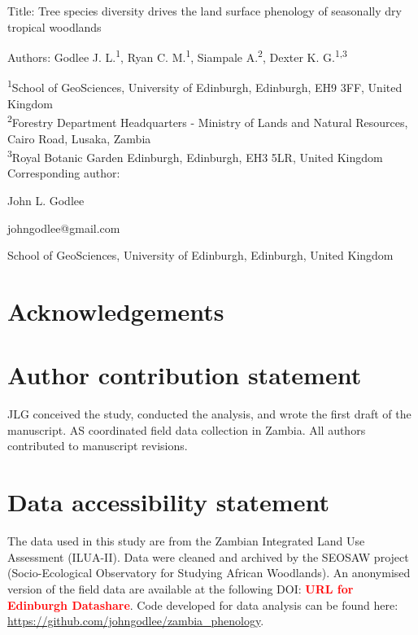 \documentclass[11pt,a4paper]{article}
\newcommand{\todo}[1]{\textcolor{red}{\textbf{#1}}}   %
\begin{document}
{\Large{Title: Tree species diversity drives the land surface phenology of seasonally dry tropical woodlands}}

Authors: Godlee J. L.\textsuperscript{1}, Ryan C. M.\textsuperscript{1}, Siampale A.\textsuperscript{2}, Dexter K. G.\textsuperscript{1,3}

\textsuperscript{1}School of GeoSciences, University of Edinburgh, Edinburgh, EH9 3FF, United Kingdom \\
\textsuperscript{2}Forestry Department Headquarters - Ministry of Lands and Natural Resources, Cairo Road, Lusaka, Zambia \\
\textsuperscript{3}Royal Botanic Garden Edinburgh, Edinburgh, EH3 5LR, United Kingdom \\

\vspace{1em}
Corresponding author:

John L. Godlee

johngodlee@gmail.com

School of GeoSciences, University of Edinburgh, Edinburgh, United Kingdom

\section*{Acknowledgements}

\section*{Author contribution statement}

JLG conceived the study, conducted the analysis, and wrote the first draft of the manuscript. AS coordinated field data collection in Zambia. All authors contributed to manuscript revisions. 

\section*{Data accessibility statement}

The data used in this study are from the Zambian Integrated Land Use Assessment (ILUA-II). Data were cleaned and archived by the SEOSAW project (Socio-Ecological Observatory for Studying African Woodlands). An anonymised version of the field data are available at the following DOI: \todo{URL for Edinburgh Datashare}. Code developed for data analysis can be found here: \url{https://github.com/johngodlee/zambia_phenology}.

\newpage{}
\linenumbers
\end{document}
